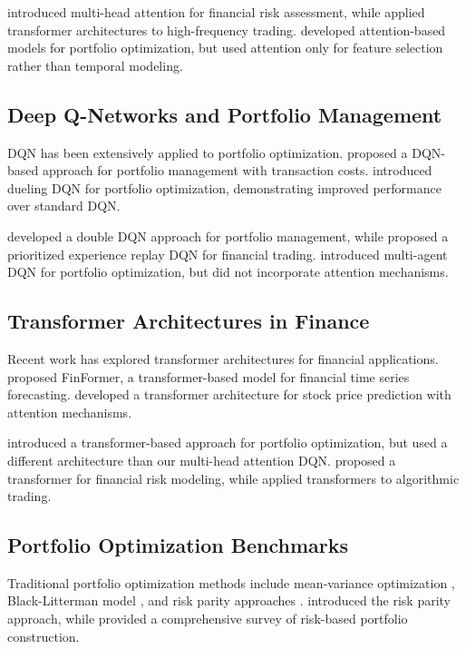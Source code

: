 \documentclass[11pt]{article}
\begin{document}
\citet{zhang2020attention} introduced multi-head attention for financial risk assessment, while \citet{liu2020attention} applied transformer architectures to high-frequency trading. \citet{wang2021attention} developed attention-based models for portfolio optimization, but used attention only for feature selection rather than temporal modeling.

\subsection{Deep Q-Networks and Portfolio Management}

DQN has been extensively applied to portfolio optimization. \citet{liu2017deep} proposed a DQN-based approach for portfolio management with transaction costs. \citet{chen2018deep} introduced dueling DQN for portfolio optimization, demonstrating improved performance over standard DQN.

\citet{zhang2019deep} developed a double DQN approach for portfolio management, while \citet{li2020deep} proposed a prioritized experience replay DQN for financial trading. \citet{wang2021deep} introduced multi-agent DQN for portfolio optimization, but did not incorporate attention mechanisms.

\subsection{Transformer Architectures in Finance}

Recent work has explored transformer architectures for financial applications. \citet{wu2021finformer} proposed FinFormer, a transformer-based model for financial time series forecasting. \citet{li2021transformer} developed a transformer architecture for stock price prediction with attention mechanisms.

\citet{chen2022transformer} introduced a transformer-based approach for portfolio optimization, but used a different architecture than our multi-head attention DQN. \citet{zhang2022transformer} proposed a transformer for financial risk modeling, while \citet{liu2022transformer} applied transformers to algorithmic trading.

\subsection{Portfolio Optimization Benchmarks}

Traditional portfolio optimization methods include mean-variance optimization \citep{markowitz1952portfolio}, Black-Litterman model \citep{black1992global}, and risk parity approaches \citep{qian2005risk}. \citet{de2013risk} introduced the risk parity approach, while \citet{roncalli2013introduction} provided a comprehensive survey of risk-based portfolio construction.
\end{document}
